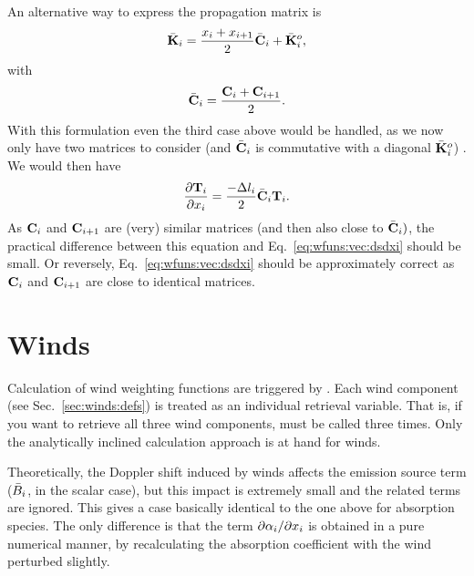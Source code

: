 An alternative way to express the propagation matrix is
\begin{displaymath}
  \bar{{\bf K}}_i = \frac{x_{i}+x_{i+1}}{2}\bar{\mathbf{C}}_i + 
   \bar{{\bf K}}_i^o,   
\end{displaymath}
with
\begin{displaymath}
  \bar{\mathbf{C}}_i = \frac{\mathbf{C}_i+\mathbf{C}_{i+1}}{2}.   
\end{displaymath}
With this formulation even the third case above would be handled, as we now
only have two matrices to consider (and $\bar{\mathbf{C}}_i$ is commutative
with a diagonal $\bar{{\bf K}}_i^o$) . We would then have
\begin{displaymath}
  \frac{\partial\mathbf{T}_{i}}{\partial x_{i}} =  
  \frac{-\Delta l_{i}}{2} \bar{\mathbf{C}}_i \mathbf{T}_{i}.    
\end{displaymath}
As $\mathbf{C}_i$ and $\mathbf{C}_{i+1}$ are (very) similar matrices (and then
also close to $\bar{\mathbf{C}}_i)$, the practical difference between this
equation and Eq.~\ref{eq:wfuns:vec:dsdxi} should be small. Or reversely,
Eq.~\ref{eq:wfuns:vec:dsdxi} should be approximately correct as $\mathbf{C}_i$
and $\mathbf{C}_{i+1}$ are close to identical matrices.



\section{Winds}
\label{sec:wfuns:winds}
%
Calculation of wind weighting functions are triggered by
. Each wind component (see Sec.~\ref{sec:winds:defs})
is treated as an individual retrieval variable. That is, if you want to
retrieve all three wind components,  must be called
three times. Only the analytically inclined calculation approach is at hand
for winds.

Theoretically, the Doppler shift induced by winds affects the emission source
term ($\bar{B}_i$, in the scalar case), but this impact is extremely small
and the related terms are ignored. This gives a case basically identical to the
one above for absorption species. The only difference is that the term
$\partial{\alpha}_{i}/\partial x_{i}$ is obtained in a pure numerical manner,
by recalculating the absorption coefficient with the wind perturbed slightly.





